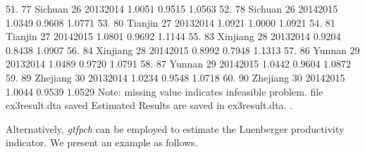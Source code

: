 51. {\VBAR}  77          Sichuan   26   2013{\tytilde}2014   1.0051   0.9515   1.0563 {\VBAR}
52. {\VBAR}  78          Sichuan   26   2014{\tytilde}2015   1.0349   0.9608   1.0771 {\VBAR}
53. {\VBAR}  80          Tianjin   27   2013{\tytilde}2014   1.0921   1.0000   1.0921 {\VBAR}
54. {\VBAR}  81          Tianjin   27   2014{\tytilde}2015   1.0801   0.9692   1.1144 {\VBAR}
55. {\VBAR}  83         Xinjiang   28   2013{\tytilde}2014   0.9204   0.8438   1.0907 {\VBAR}
56. {\VBAR}  84         Xinjiang   28   2014{\tytilde}2015   0.8992   0.7948   1.1313 {\VBAR}
57. {\VBAR}  86           Yunnan   29   2013{\tytilde}2014   1.0489   0.9720   1.0791 {\VBAR}
58. {\VBAR}  87           Yunnan   29   2014{\tytilde}2015   1.0442   0.9604   1.0872 {\VBAR}
59. {\VBAR}  89         Zhejiang   30   2013{\tytilde}2014   1.0234   0.9548   1.0718 {\VBAR}
60. {\VBAR}  90         Zhejiang   30   2014{\tytilde}2015   1.0044   0.9539   1.0529 {\VBAR}
{\BLC}
Note: missing value indicates infeasible problem.
file ex3result.dta saved
{\smallskip}
Estimated Results are saved in ex3result.dta.
{\smallskip}
. 


Alternatively, \textit{gtfpch} can be employed to estimate the Luenberger productivity indicator. We present an example as follows.  

